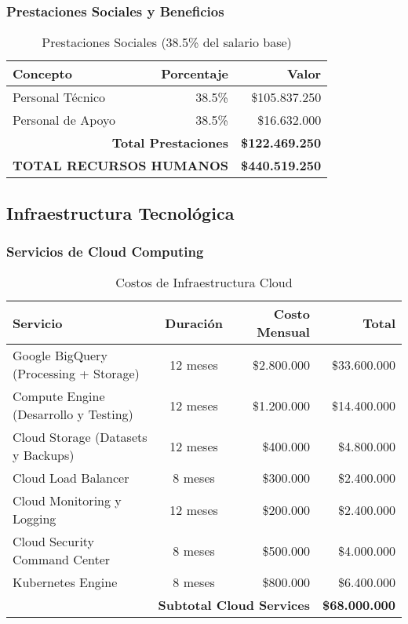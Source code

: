 \subsubsection{Prestaciones Sociales y Beneficios}

\begin{table}[H]
    \centering
    \caption{Prestaciones Sociales (38.5\% del salario base)}
    \label{tab:prestaciones}
    \small
    \begin{tabular}{|l|r|r|}
        \hline
        \textbf{Concepto} & \textbf{Porcentaje} & \textbf{Valor} \\
        \hline
        Personal Técnico & 38.5\% & \$105.837.250 \\
        \hline
        Personal de Apoyo & 38.5\% & \$16.632.000 \\
        \hline
        \multicolumn{2}{|r|}{\textbf{Total Prestaciones}} & \textbf{\$122.469.250} \\
        \hline
        \multicolumn{2}{|r|}{\textbf{TOTAL RECURSOS HUMANOS}} & \textbf{\$440.519.250} \\
        \hline
    \end{tabular}
\end{table}

\subsection{Infraestructura Tecnológica}

\subsubsection{Servicios de Cloud Computing}

\begin{table}[H]
    \centering
    \caption{Costos de Infraestructura Cloud}
    \label{tab:cloud_costs}
    \small
    \begin{tabular}{|l|c|r|r|}
        \hline
        \textbf{Servicio} & \textbf{Duración} & \textbf{Costo Mensual} & \textbf{Total} \\
        \hline
        Google BigQuery (Processing + Storage) & 12 meses & \$2.800.000 & \$33.600.000 \\
        \hline
        Compute Engine (Desarrollo y Testing) & 12 meses & \$1.200.000 & \$14.400.000 \\
        \hline
        Cloud Storage (Datasets y Backups) & 12 meses & \$400.000 & \$4.800.000 \\
        \hline
        Cloud Load Balancer & 8 meses & \$300.000 & \$2.400.000 \\
        \hline
        Cloud Monitoring y Logging & 12 meses & \$200.000 & \$2.400.000 \\
        \hline
        Cloud Security Command Center & 8 meses & \$500.000 & \$4.000.000 \\
        \hline
        Kubernetes Engine & 8 meses & \$800.000 & \$6.400.000 \\
        \hline
        \multicolumn{3}{|r|}{\textbf{Subtotal Cloud Services}} & \textbf{\$68.000.000} \\
        \hline
    \end{tabular}
\end{table}

